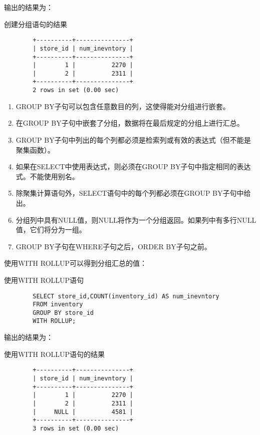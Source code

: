 \documentclass[UTF8]{article}
\begin{document}
输出的结果为：

\begin{listing}[H]
	\caption{创建分组语句的结果}
	\label{code:setgroupclauseresult}
\begin{verbatim}
        +----------+---------------+
        | store_id | num_inevntory |
        +----------+---------------+
        |        1 |          2270 |
        |        2 |          2311 |
        +----------+---------------+
        2 rows in set (0.00 sec)
\end{verbatim}
\end{listing}

\begin{orangebox}[frametitle={Tips 13.1.1 GROUP BY子句注意事项}]
        \begin{enumerate}
                \item GROUP BY子句可以包含任意数目的列，这使得能对分组进行嵌套。
                \item 在GROUP BY子句中嵌套了分组，数据将在最后规定的分组上进行汇总。
                \item GROUP BY子句中列出的每个列都必须是检索列或有效的表达式（但不能是聚集函数）。
                \item 如果在SELECT中使用表达式，则必须在GROUP BY子句中指定相同的表达式。不能使用别名。
                \item 除聚集计算语句外，SELECT语句中的每个列都必须在GROUP BY子句中给出。
                \item 分组列中具有NULL值，则NULL将作为一个分组返回。如果列中有多行NULL值，它们将分为一组。
                \item GROUP BY子句在WHERE子句之后，ORDER BY子句之前。
        \end{enumerate}    
\end{orangebox}

使用WITH ROLLUP可以得到分组汇总的值：

\begin{listing}[H]
	\caption{使用WITH ROLLUP语句}
	\label{code:usewithrillupclause}
\begin{verbatim}
        SELECT store_id,COUNT(inventory_id) AS num_inevntory 
        FROM inventory 
        GROUP BY store_id 
        WITH ROLLUP;
\end{verbatim}
\end{listing}

输出的结果为：

\begin{listing}[H]
	\caption{使用WITH ROLLUP语句的结果}
	\label{code:usewithrillupclauseresult}
\begin{verbatim}
        +----------+---------------+
        | store_id | num_inevntory |
        +----------+---------------+
        |        1 |          2270 |
        |        2 |          2311 |
        |     NULL |          4581 |
        +----------+---------------+
        3 rows in set (0.00 sec)
\end{verbatim}
\end{listing}
\end{document}
